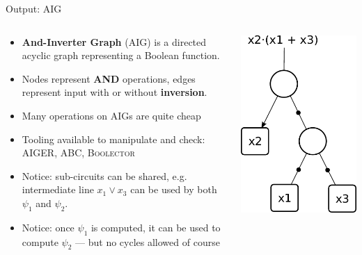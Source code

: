 \documentclass[aspectratio=169]{beamer}
\begin{document}
\begin{frame}{Output: AIG}
\begin{columns}
\begin{column}{0.68\textwidth}
\begin{itemize}
    \item \textbf{And-Inverter Graph} (AIG) is a directed acyclic graph
        representing a Boolean function.
    \item Nodes represent \textbf{AND} operations, edges represent
        input with or without \textbf{inversion}.
    \item Many operations on AIGs are quite cheap
    \item Tooling available to manipulate and check: \textsc{AIGER, ABC, Boolector}
    \item Notice: sub-circuits can be shared, e.g. intermediate line $x_1 \lor
        x_3$ can be used by both $\psi_1$ and $\psi_2$.
    \item Notice: once $\psi_1$ is computed, it can be used to compute $\psi_2$
        --- but no cycles allowed of course
\end{itemize}
\end{column}
\begin{column}{0.28\textwidth}
\begin{center}
\includegraphics[scale=0.6]{And-inverter-graph.pdf}
\end{center}
\end{column}
\end{columns}
\end{frame}
\end{document}
